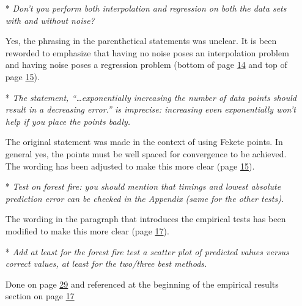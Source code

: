 \begin{itemize}[leftmargin=.5cm]
\item[*] {\it Don’t you perform both interpolation and regression on both the data sets with and without noise?}\vspace{.2cm}

Yes, the phrasing in the parenthetical statements was unclear. It is been reworded to emphasize that having no noise poses an interpolation problem and having noise poses a regression problem (bottom of page \hyperlink{page.14}{14} and top of page \hyperlink{page.15}{15}).

\item[*] {\it The statement, ``\ldots exponentially increasing the number of data points should result in a decreasing error.'' is imprecise: increasing even exponentially won’t help if you place the points badly.}\vspace{.2cm}

The original statement was made in the context of using Fekete points. In general yes, the points must be well spaced for convergence to be achieved. The wording has been adjusted to make this more clear (page \hyperlink{page.15}{15}).

\newpage\setcounter{page}{0}\thispagestyle{empty}
\item[*] {\it Test on forest fire: you should mention that timings and lowest absolute prediction error can be checked in the Appendix (same for the other tests).}\vspace{.2cm}

The wording in the paragraph that introduces the empirical tests has been modified to make this more clear (page \hyperlink{page.17}{17}).

\item[*] {\it Add at least for the forest fire test a scatter plot of predicted values versus correct values, at least for the two/three best methods.}\vspace{.2cm}

Done on page \hyperlink{page.29}{29} and referenced at the beginning of the empirical results section on page \hyperlink{page.17}{17}


\end{itemize}

\newpage
